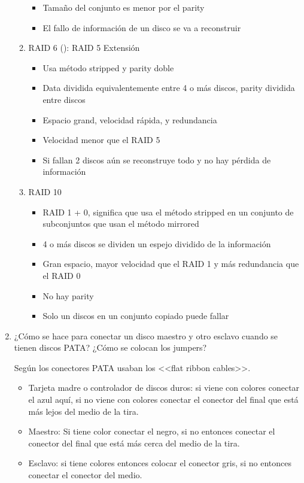 \documentclass[stu, 12pt, letterpaper, donotrepeattitle, floatsintext, natbib, helv]{apa7}
\begin{document}
\begin{enumerate}
\begin{enumerate}
\begin{itemize}
            \item Tamaño del conjunto es menor por el parity
            \item El fallo de información de un disco se va a reconstruir
        \end{itemize}
        \item RAID 6 (\cite{RAIDToo}): RAID 5 Extensión
        \begin{itemize}
            \item Usa método stripped y parity doble
            \item Data dividida equivalentemente entre 4 o más discos, parity dividida entre discos
            \item Espacio grand, velocidad rápida, y redundancia
            \item Velocidad menor que el RAID 5
            \item Si fallan 2 discos aún se reconstruye todo y no hay pérdida de información
        \end{itemize}
        \item RAID 10
        \begin{itemize}
            \item RAID 1 + 0, significa que usa el método stripped en un conjunto de subconjuntos que usan el método mirrored
            \item 4 o más discos se dividen un espejo dividido de la información
            \item Gran espacio, mayor velocidad que el RAID 1 y más redundancia que el RAID 0
            \item No hay parity
            \item Solo un discos en un conjunto copiado puede fallar
        \end{itemize}
    \end{enumerate}
    
    \item ¿Cómo se hace para conectar un disco maestro y otro esclavo cuando se tienen discos PATA? ¿Cómo se colocan los jumpers?
    
    Según \cite{PATA} los conectores PATA usaban los <<flat ribbon cables>>.
    \begin{itemize}
        \item Tarjeta madre o controlador de discos duros: si viene con colores conectar el azul aquí, si no viene con colores conectar el conector del final que está más lejos del medio de la tira.
        \item Maestro: Si tiene color conectar el negro, si no entonces conectar el conector del final que está más cerca del medio de la tira.
        \item Esclavo: si tiene colores entonces colocar el conector gris, si no entonces conectar el conector del medio.
    \end{itemize}
    

\end{enumerate}
\end{document}
